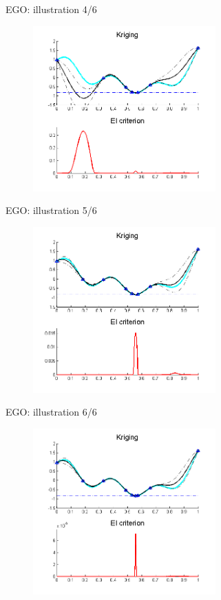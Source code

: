 \begin{frame}[noframenumbering]{EGO: illustration  4/6}\begin{figure}[h!]  \centering	\includegraphics[width=7cm]{fig/ego4.png} \end{figure} \end{frame}
\begin{frame}[noframenumbering]{EGO: illustration  5/6}\begin{figure}[h!]  \centering	\includegraphics[width=7cm]{fig/ego5.png} \end{figure} \end{frame}
\begin{frame}[noframenumbering]{EGO: illustration  6/6}\begin{figure}[h!]  \centering	\includegraphics[width=7cm]{fig/ego6.png} \end{figure} \end{frame}
